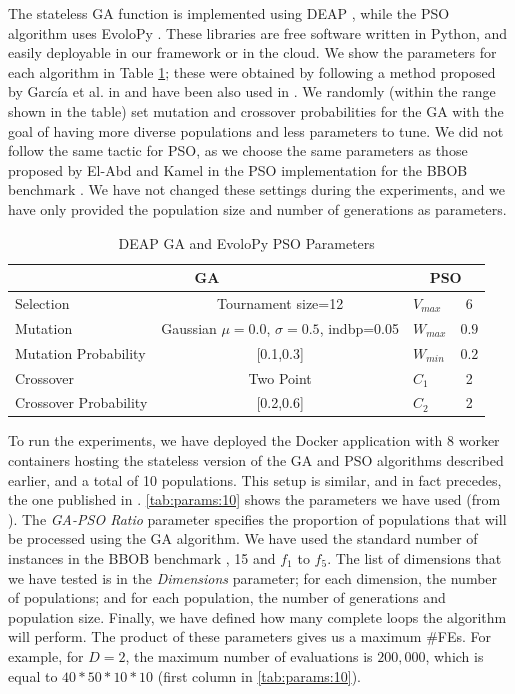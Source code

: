 \documentclass[runningheads]{llncs}
\begin{document}
The stateless GA function is implemented using DEAP
\cite{fortin2012deap}, while the PSO algorithm uses EvoloPy
\cite{faris2016evolopy}. These libraries are free software written in
Python, and easily deployable in our framework or in the cloud.  We
show the parameters for each algorithm in Table \ref{tab:GAparams};
these were obtained by following a method proposed by García et al. in
\cite{garcia2017benchmarking:anon} and have been also used in
\cite{GARCIAVALDEZ2021234:anon}. We randomly (within the range shown
in the table) set mutation and crossover probabilities for the GA with
the goal of having more diverse populations and less parameters to
tune. We did not follow the same tactic for PSO, as we choose the same
parameters as those proposed by El-Abd and Kamel in the PSO
implementation for the BBOB benchmark \cite{el2009blackHybrid}. We
have not changed these settings during the experiments, and we have
only provided the population size and number of generations as
parameters.

\begin{table}
  \small
  \caption{ DEAP GA and EvoloPy PSO Parameters }
  \label{tab:GAparams} 
  \centering
  \small
  \begin{tabular}{|l|c||l|c|}
    \hline
    \multicolumn{2}{|c||}{GA} & \multicolumn{2}{c|}{PSO} \\ \hline
    Selection & Tournament size=12 &      $V_{max}$ & 6                  \\ \hline
    Mutation & Gaussian $\mu=0.0$, $\sigma=0.5$, indbp=0.05 & $W_{max}$ & $0.9$     \\ \hline
    Mutation Probability & [0.1,0.3] &   $W_{min}$ & $0.2$                      \\ \hline
    Crossover & Two Point   &       $C_1$ & 2                             \\ \hline
    Crossover Probability  & [0.2,0.6] & $C_2$ & 2  \\ \hline
  \end{tabular}
\end{table}

To run the experiments, we have deployed the Docker application with 8 worker
containers hosting the stateless version of the GA and PSO algorithms described
earlier, and a total of 10 populations. This setup is similar, and in
fact precedes, the one published in \cite{GARCIAVALDEZ2021234:anon}.
\autoref{tab:params:10} shows the parameters we have used (from \cite{GARCIAVALDEZ2021234:anon}). The {\em
GA-PSO Ratio} parameter specifies the proportion of populations that
will be processed using the GA algorithm. We have used the
standard number of instances in the BBOB benchmark
\cite{hansen2016coco}, 15 and $f_1$ to $f_5$. The list of
dimensions that we have tested is in the {\em Dimensions} parameter;
for each dimension, the number of populations;
and for each population, the number of generations and population
size. Finally, we have defined how many complete loops the algorithm
will perform. The product of these parameters gives us a maximum
\#FEs. For example, for $D = 2$, the maximum number of evaluations is
$200,000$, which is equal to $40*50*10*10$ (first column in \autoref{tab:params:10}).
\end{document}
